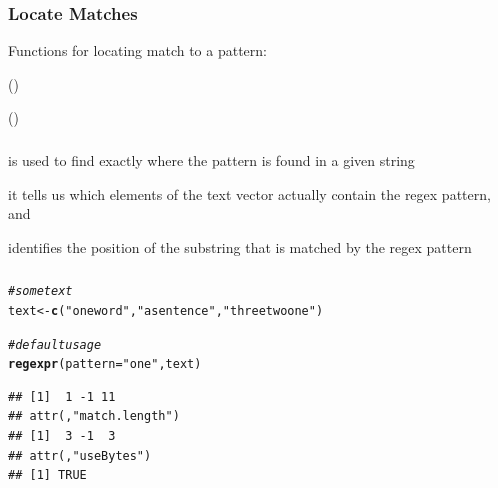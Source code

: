 \documentclass[12pt]{beamer}\usepackage[]{graphicx}\usepackage[]{color}
\makeatletter
\newcommand{\hlstr}[1]{\textcolor[rgb]{0.192,0.494,0.8}{#1}}%
\newcommand{\hlcom}[1]{\textcolor[rgb]{0.678,0.584,0.686}{\textit{#1}}}%
\newcommand{\hlstd}[1]{\textcolor[rgb]{0.345,0.345,0.345}{#1}}%
\newcommand{\hlkwb}[1]{\textcolor[rgb]{0.69,0.353,0.396}{#1}}%
\newcommand{\hlkwc}[1]{\textcolor[rgb]{0.333,0.667,0.333}{#1}}%
\newcommand{\hlkwd}[1]{\textcolor[rgb]{0.737,0.353,0.396}{\textbf{#1}}}%
\newenvironment{kframe}{%
 \def\at@end@of@kframe{}%
 \ifinner\ifhmode%
  \def\at@end@of@kframe{\end{minipage}}%
  \begin{minipage}{\columnwidth}%
 \fi\fi%
 \def\FrameCommand##1{\hskip\@totalleftmargin \hskip-\fboxsep
 \colorbox{shadecolor}{##1}\hskip-\fboxsep
     \hskip-\linewidth \hskip-\@totalleftmargin \hskip\columnwidth}%
 \MakeFramed {\advance\hsize-\width
   \@totalleftmargin\z@ \linewidth\hsize
   \@setminipage}}%
 {\par\unskip\endMakeFramed%
 \at@end@of@kframe}
\newenvironment{knitrout}{}{} %
\makeatother
\begin{document}

\begin{frame}
\begin{center}
\Huge{}
\end{center}
\end{frame}


\begin{frame}
\frametitle{Locate Matches}

Functions for locating match to a pattern: 
\bbi
  \item {}
  \item {}
  \item {} ()
  \item {} ()
\ei

\end{frame}


\begin{frame}[fragile]
\frametitle{}

\bi
  \item {} is used to find exactly where the pattern is found in a given string
  \item it tells us which elements of the text vector actually contain the regex pattern, and
 \item identifies the position of the substring that is matched by the regex pattern
\ei

\end{frame}


\begin{frame}[fragile]
\frametitle{}

\begin{knitrout}\footnotesize
{}\color{fgcolor}\begin{kframe}
\begin{alltt}
\hlcom{# some text}
\hlstd{text} \hlkwb{<-} \hlkwd{c}\hlstd{(}\hlstr{"one word"}\hlstd{,} \hlstr{"a sentence"}\hlstd{,} \hlstr{"three two one"}\hlstd{)}

\hlcom{# default usage}
\hlkwd{regexpr}\hlstd{(}\hlkwc{pattern} \hlstd{=} \hlstr{"one"}\hlstd{, text)}
\end{alltt}
\begin{verbatim}
## [1]  1 -1 11
## attr(,"match.length")
## [1]  3 -1  3
## attr(,"useBytes")
## [1] TRUE
\end{verbatim}
\end{kframe}
\end{knitrout}

\end{frame}
\end{document}
